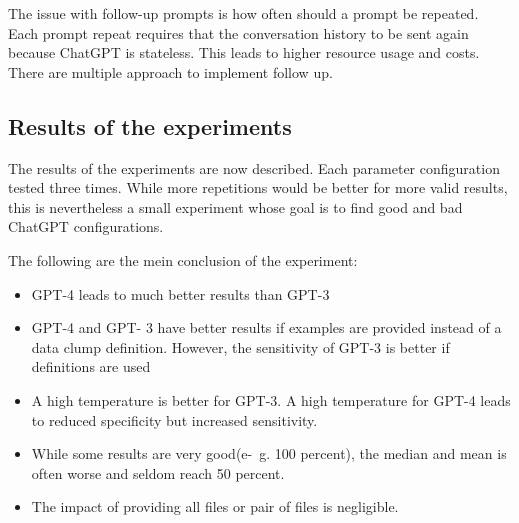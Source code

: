 The issue  with follow-up prompts is how often should a prompt be repeated. Each prompt repeat requires that the conversation history to be sent again because ChatGPT is stateless. This leads to higher resource usage and costs. There are multiple approach to implement follow up.
\begin{comment}
\begin{description}
\item[Full project follow-up] The whole project (all relevant files) is sent to  ChatGPT again with an instruction to find more data clumps. As a result, more data is sent per  request while the number of request can be reduced. As a  result, ChatGPt might find additional data clumps that it has not found during the previous prompts.
\item [Tuple-based follow-up] A tuple of two files in the project (i.~e. the content of those files) is sent again to ChatGPT with the instruction to find more data clumps. If the goal is to data clumps between tuples of all files, $0.5*n*(n-1)$ file tuples need to uploaded so that many requests will needed. However, this can help ChatGPT to focus on a smaller part of the software project to analyze in order to find more data clumps.
\end{description}
\end{comment}

\subsection{Results of the experiments}\label{sec:initial_experiments}

The results of the experiments are now described. Each parameter configuration tested three times. While more repetitions would be better for more valid results, this is nevertheless a small experiment whose goal is to find good and bad ChatGPT configurations. 

The following are the mein conclusion of the experiment:
\begin{itemize}
    \item GPT-4 leads to much better results than GPT-3
    \item GPT-4 and GPT-
    3 have better results if examples are provided instead of a data clump definition. However, the sensitivity of GPT-3 is better if definitions are used
    \item A high temperature is better for GPT-3. A high temperature for GPT-4 leads to reduced specificity but increased sensitivity. 
    \item While some results are very good(e-~g. 100 percent), the median and mean is often worse and seldom reach 50 percent. 
    \item The impact of providing all files or pair of files is negligible. 
\end{itemize}

